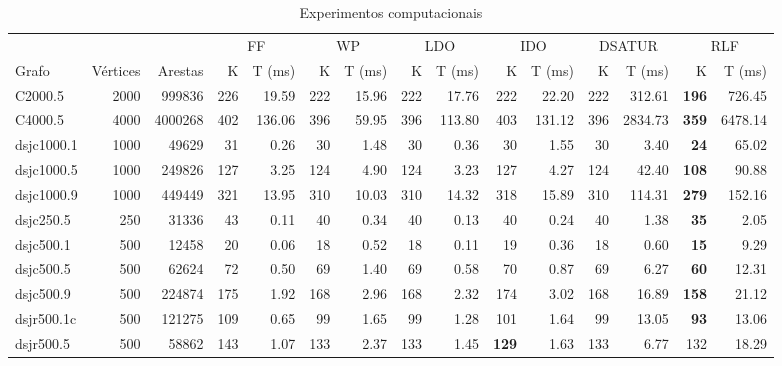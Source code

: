\begin{table*}
    \caption{Experimentos computacionais}
    \label{tab:experiments}
    \begin{adjustbox}{width=\textwidth}%
    \small
    \centering
    \begin{minipage}[b]{\textwidth}
        \centering
\begin{tabular}{@{} lrrrrrrrrrrrrrr @{}}
\toprule
& & & \multicolumn{2}{c}{FF} & \multicolumn{2}{c}{WP} & \multicolumn{2}{c}{LDO} & \multicolumn{2}{c}{IDO} & \multicolumn{2}{c}{DSATUR} & \multicolumn{2}{c}{RLF}\\
\cmidrule(lr){4-5}\cmidrule(lr){6-7}\cmidrule(lr){8-9}\cmidrule(lr){10-11}\cmidrule(lr){12-13}\cmidrule(lr){14-15}
Grafo & Vértices & Arestas & K & T (ms) & K & T (ms) & K & T (ms) & K & T (ms) & K & T (ms) & K & T (ms) \\
\midrule
C2000.5 & 2000 & 999836 & 226 & 19.59 & 222 & 15.96 & 222 & 17.76 & 222 & 22.20 & 222 & 312.61 & \textbf{196} & 726.45 \\
C4000.5 & 4000 & 4000268 & 402 & 136.06 & 396 & 59.95 & 396 & 113.80 & 403 & 131.12 & 396 & 2834.73 & \textbf{359} & 6478.14 \\
dsjc1000.1 & 1000 & 49629 & 31 & 0.26 & 30 & 1.48 & 30 & 0.36 & 30 & 1.55 & 30 & 3.40 & \textbf{24} & 65.02 \\
dsjc1000.5 & 1000 & 249826 & 127 & 3.25 & 124 & 4.90 & 124 & 3.23 & 127 & 4.27 & 124 & 42.40 & \textbf{108} & 90.88 \\
dsjc1000.9 & 1000 & 449449 & 321 & 13.95 & 310 & 10.03 & 310 & 14.32 & 318 & 15.89 & 310 & 114.31 & \textbf{279} & 152.16 \\
dsjc250.5 & 250 & 31336 & 43 & 0.11 & 40 & 0.34 & 40 & 0.13 & 40 & 0.24 & 40 & 1.38 & \textbf{35} & 2.05 \\
dsjc500.1 & 500 & 12458 & 20 & 0.06 & 18 & 0.52 & 18 & 0.11 & 19 & 0.36 & 18 & 0.60 & \textbf{15} & 9.29 \\
dsjc500.5 & 500 & 62624 & 72 & 0.50 & 69 & 1.40 & 69 & 0.58 & 70 & 0.87 & 69 & 6.27 & \textbf{60} & 12.31 \\
dsjc500.9 & 500 & 224874 & 175 & 1.92 & 168 & 2.96 & 168 & 2.32 & 174 & 3.02 & 168 & 16.89 & \textbf{158} & 21.12 \\
dsjr500.1c & 500 & 121275 & 109 & 0.65 & 99 & 1.65 & 99 & 1.28 & 101 & 1.64 & 99 & 13.05 & \textbf{93} & 13.06 \\
dsjr500.5 & 500 & 58862 & 143 & 1.07 & 133 & 2.37 & 133 & 1.45 & \textbf{129} & 1.63 & 133 & 6.77 & 132 & 18.29 \\

\end{tabular}
\end{minipage}
\end{adjustbox}
\end{table*}
